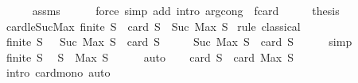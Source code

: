 \begin{isabellebody}
\ \ \ \ \isamarkupfalse%
\ assms\isanewline
\ \ \ \ \isamarkupfalse%
\ {\isacharparenleft}{\kern0pt}force\ simp\ add{\isacharcolon}{\kern0pt}\ intro{\isacharcolon}{\kern0pt}\ arg{\isacharunderscore}{\kern0pt}cong\ {\isacharbrackleft}{\kern0pt}\ f{\isacharequal}{\kern0pt}card{\isacharbrackright}{\kern0pt}{\isacharparenright}{\kern0pt}\isanewline
\ \ \isamarkupfalse%
\ \isamarkupfalse%
\ {\isacharquery}{\kern0pt}thesis\isacommand{{\isachardot}{\kern0pt}}\isamarkupfalse%
\isanewline
{}\isamarkupfalse%
%
\endisatagproof
{\isafoldproof}%
%
\isadelimproof
\isanewline
%
\endisadelimproof
\isanewline
{}\isamarkupfalse%
\ card{\isacharunderscore}{\kern0pt}le{\isacharunderscore}{\kern0pt}Suc{\isacharunderscore}{\kern0pt}Max{\isacharcolon}{\kern0pt}\ {\isachardoublequoteopen}finite\ S\ {\isasymLongrightarrow}\ card\ S\ {\isasymle}\ Suc\ {\isacharparenleft}{\kern0pt}Max\ S{\isacharparenright}{\kern0pt}{\isachardoublequoteclose}\isanewline
%
\isadelimproof
%
\endisadelimproof
%
\isatagproof
{}\isamarkupfalse%
\ {\isacharparenleft}{\kern0pt}rule\ classical{\isacharparenright}{\kern0pt}\isanewline
\ \ \isamarkupfalse%
\ {\isachardoublequoteopen}finite\ S{\isachardoublequoteclose}\ \ {\isachardoublequoteopen}{\isasymnot}\ Suc\ {\isacharparenleft}{\kern0pt}Max\ S{\isacharparenright}{\kern0pt}\ {\isasymge}\ card\ S{\isachardoublequoteclose}\isanewline
\ \ \isamarkupfalse%
\ \isamarkupfalse%
\ {\isachardoublequoteopen}Suc\ {\isacharparenleft}{\kern0pt}Max\ S{\isacharparenright}{\kern0pt}\ {\isacharless}{\kern0pt}\ card\ S{\isachardoublequoteclose}\isanewline
\ \ \ \ \isamarkupfalse%
\ simp\isanewline
\ \ \isamarkupfalse%
\ {\isacharbackquoteopen}finite\ S{\isacharbackquoteclose}\ \isamarkupfalse%
\ {\isachardoublequoteopen}S\ {\isasymsubseteq}\ {\isacharbraceleft}{\kern0pt}{}{\isachardot}{\kern0pt}{\isachardot}{\kern0pt}Max\ S{\isacharbraceright}{\kern0pt}{\isachardoublequoteclose}\isanewline
\ \ \ \ \isamarkupfalse%
\ auto\isanewline
\ \ \isamarkupfalse%
\ {\isachardoublequoteopen}card\ S\ {\isasymle}\ card\ {\isacharbraceleft}{\kern0pt}{}{\isachardot}{\kern0pt}{\isachardot}{\kern0pt}Max\ S{\isacharbraceright}{\kern0pt}{\isachardoublequoteclose}\isanewline
\ \ \ \ \isamarkupfalse%
\ {\isacharparenleft}{\kern0pt}intro\ card{\isacharunderscore}{\kern0pt}mono{\isacharsemicolon}{\kern0pt}\ auto{\isacharparenright}{\kern0pt}\isanewline

\end{isabellebody}
